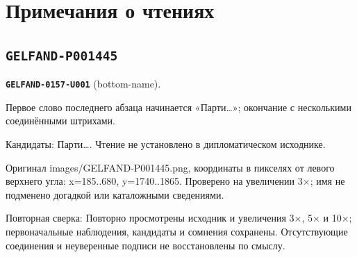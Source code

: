 \section*{Примечания о чтениях}
\subsection*{\texttt{GELFAND-P001445}}
\par\noindent\leavevmode{}\label{GELFAND-0157-U001}\label{GELFAND-P001445:bottom-name}\textbf{\texttt{GELFAND-0157-U001}} (bottom-name).\nopagebreak[4]\par
Первое слово последнего абзаца начинается «Парти…»; окончание с несколькими соединёнными штрихами.\par
Кандидаты: Парти…. Чтение не установлено в дипломатическом исходнике.\par
Оригинал images/GELFAND-P001445.png, координаты в пикселях от левого верхнего угла: x=185..680, y=1740..1865. Проверено на увеличении 3×; имя не подменено догадкой или каталожными сведениями.\par
Повторная сверка: Повторно просмотрены исходник и увеличения 3×, 5× и 10×; первоначальные наблюдения, кандидаты и сомнения сохранены. Отсутствующие соединения и неуверенные подписи не восстановлены по смыслу.\par\medskip
